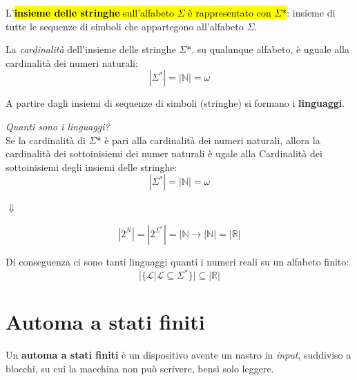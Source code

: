 \documentclass[12pt, a4paper, oneside]{book}
\begin{document}
    L'\hl{\textbf{insieme delle stringhe} sull'alfabeto $\Sigma$ è rappresentato con $\Sigma$*}: insieme di tutte le sequenze di simboli che appartegono all'alfabeto $\Sigma$.


    La \textit{cardinalità} dell'insieme delle stringhe $\Sigma$*, su qualunque alfabeto, è uguale alla cardinalità dei numeri naturali:
   \begin{equation*}
    |\Sigma^*| = |\mathbb{N}| = \omega
  \end{equation*}

  A partire dagli insiemi di sequenze di simboli (stringhe) si formano i \textbf{linguaggi}.


  \textit{Quanti sono i linguaggi?} \\[0.2ex]
  Se la cardinalità di $\Sigma$* è pari alla cardinalità dei numeri naturali, allora la cardinalità dei sottoinisiemi dei numer naturali è ugale alla Cardinalità dei sottoinisiemi degli insiemi delle stringhe:
  \begin{equation*}
    |\Sigma^*| = |\mathbb{N}| = \omega 
  \end{equation*}
  \begin{center}
    $\Downarrow$
  \end{center}
  \begin{equation*}
    |2^N| = |2^{\Sigma^*}| = |\mathbb{N} \rightarrow |\mathbb{N}| = |\mathbb{R}|
  \end{equation*}

  Di conseguenza ci sono tanti linguaggi quanti i numeri reali su un alfabeto finito:
  \begin{equation*}
    |\{ \mathcal{L} | \mathcal{L} \subseteq \Sigma^*\}| \subseteq |\mathbb{R}|
  \end{equation*}




  \section{Automa a stati finiti}
  Un \textbf{automa a stati finiti} è un dispositivo avente un nastro in \textit{input}, suddiviso a blocchi, su cui la macchina non può scrivere, bensì solo leggere.
\end{document}
